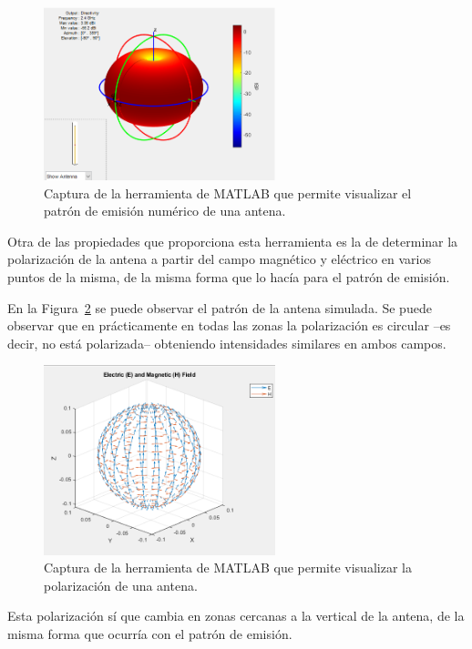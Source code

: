 \begin{figure}[H]
    \centering
    \includegraphics[width=0.6\textwidth]{pic/patron.png}
    \caption{Captura de la herramienta de MATLAB que permite visualizar el patrón de emisión numérico de una antena.}
    \label{fig:patron_matlab}
\end{figure}

Otra de las propiedades que proporciona esta herramienta es la de determinar la polarización de la antena a partir del campo magnético y eléctrico en varios puntos de la misma, de la misma forma que lo hacía para el patrón de emisión.\cite{MATLAB}

En la Figura~\ref{fig:eh_matlab} se puede observar el patrón de la antena simulada.
Se puede observar que en prácticamente en todas las zonas la polarización es circular --es decir, no está polarizada-- obteniendo intensidades similares en ambos campos.

\begin{figure}[H]
    \centering
    \includegraphics[width=0.6\textwidth]{pic/eh.png}
    \caption{Captura de la herramienta de MATLAB que permite visualizar la polarización de una antena.}
    \label{fig:eh_matlab}
\end{figure}

Esta polarización sí que cambia en zonas cercanas a la vertical de la antena, de la misma forma que ocurría con el patrón de emisión.

